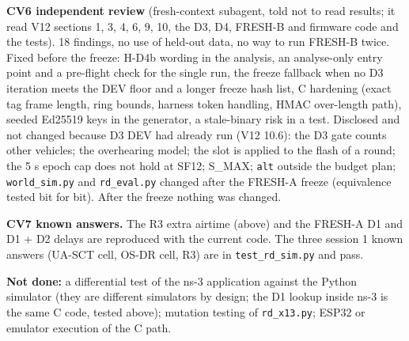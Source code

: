 \textbf{CV6 independent review} (fresh-context subagent, told not to read results; it read V12 sections 1, 3, 4, 6, 9, 10, the D3, D4, FRESH-B and firmware code and the tests). 18 findings, no use of held-out data, no way to run FRESH-B twice. Fixed before the freeze: H-D4b wording in the analysis, an analyse-only entry point and a pre-flight check for the single run, the freeze fallback when no D3 iteration meets the DEV floor and a longer freeze hash list, C hardening (exact tag frame length, ring bounds, harness token handling, HMAC over-length path), seeded Ed25519 keys in the generator, a stale-binary risk in a test. Disclosed and not changed because D3 DEV had already run (V12 10.6): the D3 gate counts other vehicles; the overhearing model; the slot is applied to the flash of a round; the 5 s epoch cap does not hold at SF12; S\_MAX; \texttt{alt} outside the budget plan; \texttt{world\_sim.py} and \texttt{rd\_eval.py} changed after the FRESH-A freeze (equivalence tested bit for bit). After the freeze nothing was changed.

\textbf{CV7 known answers.} The R3 extra airtime (above) and the FRESH-A D1 and D1 + D2 delays are reproduced with the current code. The three session 1 known answers (UA-SCT cell, OS-DR cell, R3) are in \texttt{test\_rd\_sim.py} and pass.

\textbf{Not done:} a differential test of the ns-3 application against the Python simulator (they are different simulators by design; the D1 lookup inside ns-3 is the same C code, tested above); mutation testing of \texttt{rd\_x13.py}; ESP32 or emulator execution of the C path.


